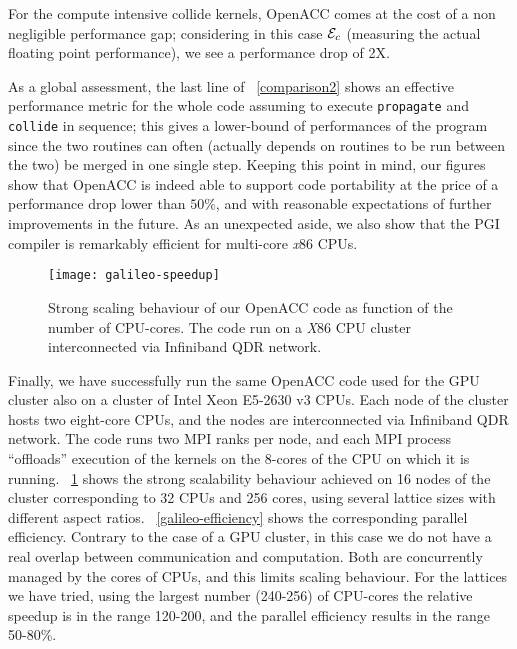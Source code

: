 \documentclass[times]{cpeauth}
\begin{document}
For the compute intensive collide kernels, OpenACC comes at the cost of a non 
negligible performance gap; considering in this case ${\cal E}_c$ 
(measuring the actual floating point performance), we see a performance drop of 2X.

As a global assessment, the last line of \tablename~\ref{comparison2} shows 
an effective performance metric for the whole code assuming to execute  
{\tt propagate} and {\tt collide} in sequence; this gives a lower-bound of  
performances of the program since the two routines can often (actually 
depends on routines to be run between the two) be merged in one single step.
%
Keeping this point in mind, our figures show that OpenACC is indeed able to support 
code portability at the price of a performance drop lower than $50\%$, and 
with reasonable expectations of further improvements in the future.
%
As an unexpected aside, we also show that the PGI compiler is  
remarkably efficient for multi-core {\em x}86 CPUs.

%
\begin{figure}
\centering
\texttt{[image: galileo-speedup]}
\caption{\label{galileo-speedup} Strong scaling behaviour of our OpenACC code 
as function of the number of CPU-cores. The code run on a {\em X}86 CPU cluster 
interconnected via Infiniband QDR network.}
\end{figure}
%

Finally, we have successfully run the same OpenACC code used for the GPU cluster 
also on a cluster of Intel Xeon E5-2630 v3 CPUs.
%
Each node of the cluster hosts two eight-core CPUs, and the nodes are 
interconnected via Infiniband QDR network.
%
The code runs two MPI ranks per node, and each MPI process ``offloads'' 
execution of the kernels on the 8-cores of the CPU on which it is running.
% 
\figurename~\ref{galileo-speedup} shows the strong scalability behaviour 
achieved on 16 nodes of the cluster corresponding to 32 CPUs and 256 cores, 
using several lattice sizes with different aspect ratios. \figurename~\ref{galileo-efficiency} 
shows the corresponding parallel efficiency. 
%
Contrary to the case of a GPU cluster, in this case we do not have a 
real overlap between communication and computation. Both are concurrently 
managed by the cores of CPUs, and this limits scaling behaviour. 
%
For the lattices we have tried, using the largest number (240-256) of 
CPU-cores the relative speedup is in the range 120-200, and the parallel efficiency 
results in the range 50-80\%.
\end{document}
